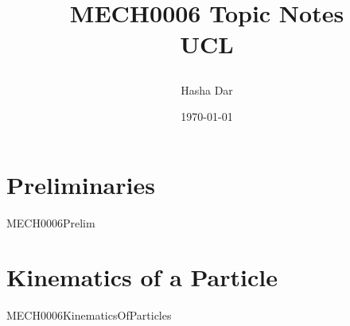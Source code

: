 \documentclass[12pt,a4paper, twoside]{report}
\begin{document}
\title{
  {MECH0006 Topic Notes}\\
  {\large UCL}
  \author{Hasha Dar}
  \date{\today}
}
\maketitle

\tableofcontents
\chapter{Preliminaries}
{MECH0006Prelim}

\chapter{Kinematics of a Particle}
{MECH0006KinematicsOfParticles}
\end{document}
